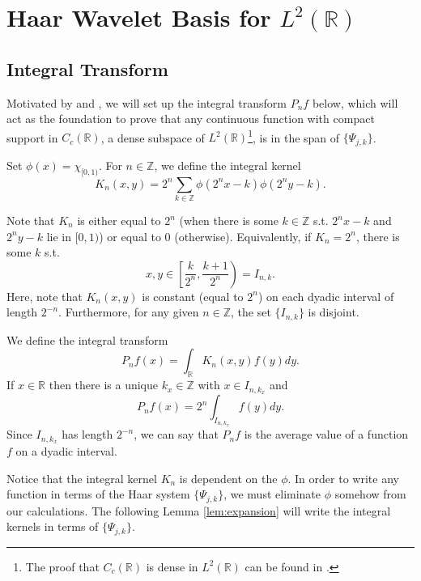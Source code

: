 \documentclass[11pt]{amsart}
\theoremstyle{theorem} %
\theoremstyle{definition}
\theoremstyle{example}
\theoremstyle{remark}
\numberwithin{equation}{section}
\newcommand{\R}{\mathbb{R}}
\newcommand{\Z}{\mathbb{Z}}
\begin{document}

\section{Haar Wavelet Basis for $ L^2(\R) $} \label{section:span}
\subsection{Integral Transform}
Motivated by \cite[3]{bell} and \cite[516]{davidson}, we will set up the integral transform $ P_nf $ below, which will act as the foundation to prove that any continuous function with compact support in $ C_c(\R) $, a dense subspace of $ L^2(\R) $\footnote{The proof that $ C_c(\R) $ is dense in $ L^2(\R) $ can be found in \cite[326]{farrell}.}, is in the span of $ \{ \varPsi_{j,k} \} $.

\vspace{8pt}
Set $ \phi(x) = \chi_{[0,1)}$. For $ n \in \Z $, we define the integral kernel
\[ K_n (x,y) = 2^n \sum_{k \in \Z} \phi(2^n x - k) \phi(2^n y - k). \]

Note that $ K_n $ is either equal to $ 2^n $ (when there is some $ k \in \Z $ s.t. $ 2^n x-k $ and $ 2^ny - k $ lie in $ [0,1) $) or equal to 0 (otherwise). Equivalently, if $ K_n = 2^n $, there is some $ k $ s.t.
\[ x,y \in \left[ \frac{k}{2^n}, \frac{k+1}{2^n} \right) = I_{n,k}. \]
Here, note that $ K_n(x,y) $ is constant (equal to $ 2^n $) on each dyadic interval of length $ 2^{-n} $. Furthermore, for any given $ n \in \Z $, the set $ \{ I_{n,k} \} $ is disjoint.

We define the integral transform
\[ P_n f(x) = \int_{\R} K_n(x,y) f(y) dy. \]
If $ x \in \R $ then there is a unique $ k_x \in \Z $ with $ x \in I_{n, k_x} $ and
\begin{equation} \label{eq:pnf}
	P_n f(x) = 2^n \int_{I_{n,k_x}} f(y) dy.
\end{equation}
Since $ I_{n,k_x} $ has length $ 2^{-n} $, we can say that $ P_nf $ is the average value of a function $ f $ on a dyadic interval.

\vspace{8pt}
Notice that the integral kernel $ K_n $ is dependent on the $ \phi $. In order to write any function in terms of the Haar system $ \{ \varPsi_{j,k} \} $, we must eliminate $ \phi $ somehow from our calculations. The following Lemma \ref{lem:expansion} will write the integral kernels in terms of $ \{ \varPsi_{j,k} \} $.
\end{document}
